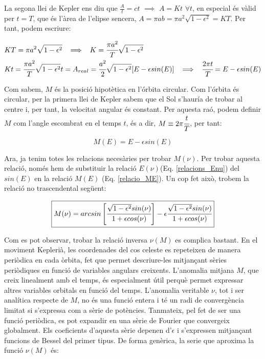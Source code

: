 \documentclass[a4paper, 11pt]{article}
\begin{document}
\noindent La segona llei de Kepler ens diu que $\frac{A}{t} = ct$ $\implies$ $A = Kt$ $\forall t$, en especial és vàlid per $t=T$, que és l'àrea de l'elipse sencera, $A = \pi ab = \pi a^2 \sqrt{1-\epsilon^2} = KT$. Per tant, podem escriure:

\begin{align*}
    &KT = \pi a^2 \sqrt{1-\epsilon^2} \hspace{2mm} \implies \hspace{2mm} K = \cfrac{\pi a^2}{T} \sqrt{1-\epsilon^2} \\
    &Kt = \cfrac{\pi a^2}{T} \sqrt{1-\epsilon^2} t = A_{real} = \cfrac{a^2}{2} \sqrt{1-\epsilon^2} [E - \epsilon sin(E)] \hspace{2mm} \implies \hspace{2mm} \cfrac{2\pi t}{T} = E - \epsilon sin(E) \\
\end{align*}

\noindent Com sabem, $M$ és la posició hipotètica en l'órbita circular. Com l'órbita és circular, per la primera llei de Kepler sabem que el Sol s'hauría de trobar al centre i, per tant, la velocitat angular és constant. Per aquesta raó, podem definir $M$ com l'angle escombrat en el temps $t$, és a dir, $M \equiv 2\pi \cfrac{t}{T}$, per tant:

\begin{equation} \label{relacio_ME}
    \boxed{M(E) = E - \epsilon sin(E)}
\end{equation}
\vspace{2mm}

\noindent Ara, ja tenim totes les relacions necesàries per trobar $M(\nu)$. Per trobar aquesta relació, només hem de substituir la relació $E(\nu)$(Eq. \ref{relacions_Enu}) del $sin(E)$ en la relació $M(E)$ (Eq. \ref{relacio_ME}). Un cop fet això, trobem la relació no trascendental següent:

\vspace{2mm}
\begin{equation} \label{relacio_Mnu}
    \boxed{ M(\nu) = arcsin \left[ \cfrac{\sqrt{1-\epsilon ^2} sin(\nu)}{1 + \epsilon cos(\nu)} \right] - \epsilon \cfrac{\sqrt{1-\epsilon ^2} sin(\nu)}{1 + \epsilon cos(\nu)} }
\end{equation}
\vspace{2mm}

\noindent Com es pot observar, trobar la relació inversa $\nu(M)$ es complica bastant. En el moviment Keplerià, les coordenades del cos celeste es repeteixen de manera periòdica en cada òrbita, fet que permet descriure-les mitjançant sèries periòdiques en funció de variables angulars creixents. L’anomalia mitjana $M$, que creix linealment amb el temps, és especialment útil perquè permet expressar altres variables orbitals en funció del temps. L’anomalia veritable $\nu$, tot i ser analítica respecte de $M$, no és una funció entera i té un radi de convergència limitat si s’expressa com a sèrie de potències. Tanmateix, pel fet de ser una funció periòdica, es pot expandir en una sèrie de Fourier que convergeix globalment. Els coeficients d’aquesta sèrie depenen d'$\epsilon$ i s’expressen mitjançant funcions de Bessel del primer tipus. De forma genèrica, la serie que aproxima la funció $\nu(M)$ és:
\end{document}
